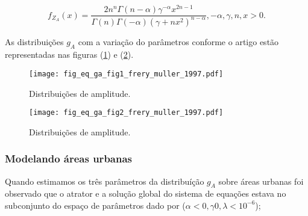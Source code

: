 \begin{equation}\label{eqn113}
	f_{Z_{A}}(x)= \frac{2n^n\Gamma(n-\alpha)\gamma^{-\alpha}x^{2n-1}}{\Gamma(n)\Gamma(-\alpha)(\gamma+nx^2)^{n-\alpha}}, -\alpha,\gamma,n, x>0. 
\end{equation}


As distribuições $g_A$ com a variação do parâmetros conforme o artigo estão representadas nas figuras (\ref{fig11}) e (\ref{fig12}).


\begin{figure}[!htb]
\centering
\texttt{[image: fig\_eq\_ga\_fig1\_frery\_muller\_1997.pdf]}
	\caption{Distribuições de amplitude.}
\label{fig11}
\end{figure}

\begin{figure}[!htb]
\centering
\texttt{[image: fig\_eq\_ga\_fig2\_frery\_muller\_1997.pdf]}
	\caption{Distribuições de amplitude.}
\label{fig12}
\end{figure}

\subsubsection{Modelando áreas urbanas}

Quando estimamos os três parâmetros da distribuíção $g_A$ sobre áreas urbanas foi observado que o atrator e a solução global do sistema de equações estava  no subconjunto do espaço de parâmetros dado por ($\alpha<0,\gamma0,\lambda<10^{-6}$); 


